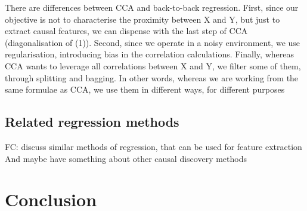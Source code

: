 \documentclass{article}
\begin{document}
There are differences between CCA and back-to-back regression.
%
First, since our objective is not to characterise the proximity between X and Y, but just to extract causal features, we can dispense with the last step of CCA (diagonalisation of (1)).
%
Second, since we operate in a noisy environment, we use regularisation, introducing bias in the correlation calculations.
%
Finally, whereas CCA wants to leverage all correlations between X and Y, we filter some of them, through splitting and bagging.
%
In other words, whereas we are working from the same formulae as CCA, we use them in different ways, for different purposes

\subsection{Related regression methods}
FC: discuss similar methods of regression, that can be used for feature extraction
And maybe have something about other causal discovery methods

\section{Conclusion}


\clearpage
\newpage




%
\end{document}

